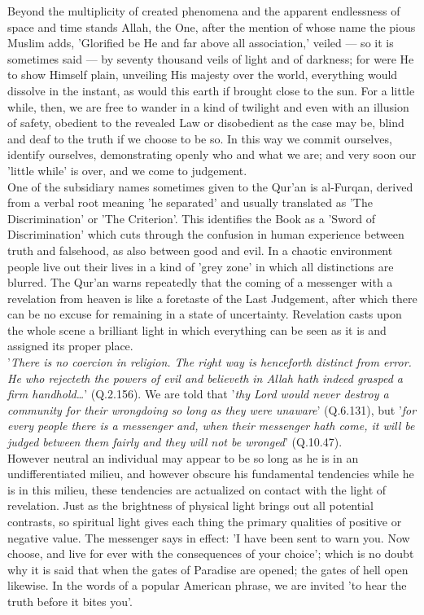 \documentclass[11pt, b5paper, twoside]{book}
\begin{document}
Beyond the multiplicity of created phenomena and the apparent endlessness of space and time stands 
Allah, the One, after the mention of whose name the pious Muslim adds, 'Glorified be He and far above 
all association,' veiled --- so it is sometimes said --- by seventy thousand veils of light and of 
darkness; for were He to show Himself plain, unveiling His majesty over the world, everything would 
dissolve in the instant, as would this earth if brought close to the sun. For a little while, then, 
we are free to wander in a kind of twilight and even with an illusion of safety, obedient to the 
revealed Law or disobedient as the case may be, blind and deaf to the truth if we choose to be so. In 
this way we commit ourselves, identify ourselves, demonstrating openly who and what we are; and very 
soon our 'little while' is over, and we come to judgement. \\

One of the subsidiary names sometimes given to the Qur'an is al-Furqan, derived from a verbal root 
meaning 'he separated' and usually translated as 'The Discrimination' or 'The Criterion'. This 
identifies the Book as a 'Sword of Discrimination' which cuts through the confusion in human 
experience between truth and falsehood, as also between good and evil. In a chaotic environment 
people live out their lives in a kind of 'grey zone' in which all distinctions are blurred. The 
Qur'an warns repeatedly that the coming of a messenger with a revelation from heaven is like a 
foretaste of the Last Judgement, after which there can be no excuse for remaining in a state of 
uncertainty. Revelation casts upon the whole scene a brilliant light in which everything can be seen 
as it is and assigned its proper place. \\

'\emph{There is no coercion in religion. The right way is henceforth distinct from error. He who rejecteth 
the powers of evil and believeth in Allah hath indeed grasped a firm handhold\ldots{}}' (Q.2.156). We are 
told that '\emph{thy Lord would never destroy a community for their wrongdoing so long as they were 
unaware}' (Q.6.131), but '\emph{for every people there is a messenger and, when their messenger hath come, it will be judged between them fairly and they will not be wronged}' (Q.10.47). \\

However neutral an individual may appear to be so long as he is in an undifferentiated milieu, and 
however obscure his fundamental tendencies while he is in this milieu, these tendencies are 
actualized on contact with the light of revelation. Just as the brightness of physical light brings 
out all potential contrasts, so spiritual light gives each thing the primary qualities of positive or 
negative value. The messenger says in effect: 'I have been sent to warn you. Now choose, and live for 
ever with the consequences of your choice'; which is no doubt why it is said that when the gates of 
Paradise are opened; the gates of hell open likewise. In the words of a popular American phrase, we 
are invited 'to hear the truth before it bites you'. \\
\end{document}

